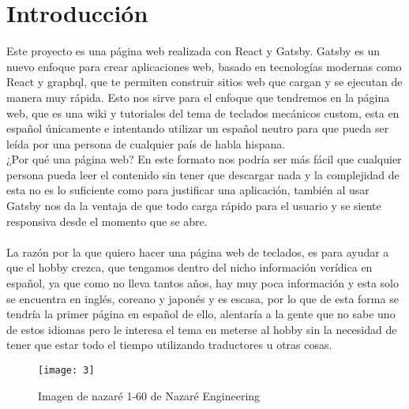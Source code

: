 \documentclass{scrreprt}
\begin{document}
	\chapter{Introducción}
		Este proyecto es una página web realizada con React y Gatsby. Gatsby es un nuevo enfoque para crear aplicaciones web, basado en tecnologías modernas como React y graphql, que te permiten construir sitios web que cargan y se ejecutan de manera muy rápida. Esto nos sirve para el enfoque que tendremos en la página web, que es una wiki y tutoriales del tema de teclados mecánicos custom, esta en español únicamente e intentando utilizar un español neutro para que pueda ser leída por una persona de cualquier país de habla hispana.\\
¿Por qué una página web? En este formato nos podría ser más fácil que cualquier persona pueda leer el contenido sin tener que descargar nada y la complejidad de esta no es lo suficiente como para justificar una aplicación, también al usar Gatsby nos da la ventaja de que todo carga rápido para el usuario y se siente responsiva desde el momento que se abre. \\
\\
La razón por la que quiero hacer una página web de teclados, es para ayudar a que el hobby crezca, que tengamos dentro del nicho información verídica en español, ya que como no lleva tantos años, hay muy poca información y esta solo se encuentra en inglés, coreano y japonés y es escasa, por lo que de esta forma se tendría la primer página en español de ello, alentaría a la gente que no sabe uno de estos idiomas pero le interesa el tema en meterse al hobby sin la necesidad de tener que estar todo el tiempo utilizando traductores u otras cosas.\\

		\begin{figure}[htbp]
			\begin{center}
				\texttt{[image: 3]}
				\caption{Imagen de nazaré 1-60 de Nazaré Engineering}
				\label{referencia}
			\end{center}
		\end{figure}

		
		
\end{document}
